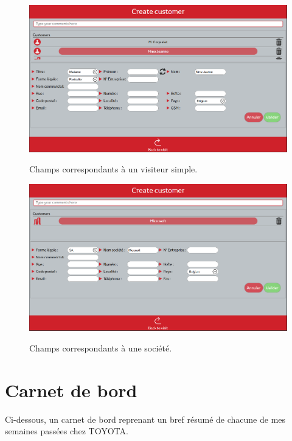 \documentclass[12pt]{report}
\begin{document}
\begin{figure}[H]
	\caption{Champs correspondants à un visiteur simple.}
	\includegraphics[width=\linewidth]{img/image_customer_1}
	\label{image_customer_1}
\end{figure}

\begin{figure}[H]
	\caption{Champs correspondants à une société.}
	\includegraphics[width=\linewidth]{img/image_customer_2}
	\label{image_customer_2}
\end{figure}

\chapter{Carnet de bord}
Ci-dessous, un carnet de bord reprenant un bref résumé de chacune de mes semaines passées chez TOYOTA.















\end{document}
